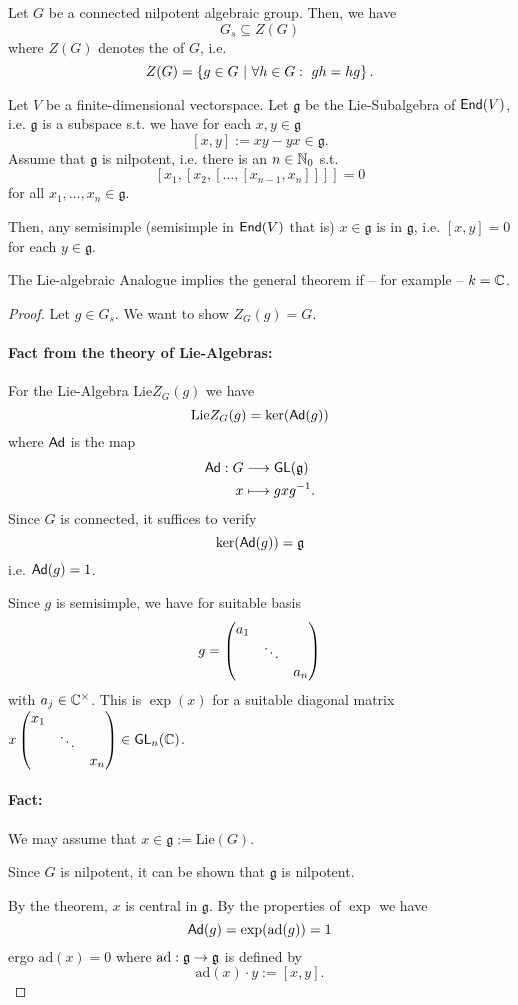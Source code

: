 \begin{theorem}
	Let $G$ be a connected nilpotent algebraic group. Then, we have
	\[ G_s \subseteq Z(G) \]
	where $Z(G)$ denotes the  of $G$, i.e.
	\[ Z(G) = \left\lbrace g \in G ~ | ~ \forall h \in G:~gh = hg\right\rbrace. \]
\end{theorem}
\begin{theorem}
Let $V$ be a finite-dimensional vectorspace. Let $\mathfrak{g}$ be the Lie-Subalgebra of $\textsf{End}(V)$, i.e. $\mathfrak{g}$ is a subspace s.t. we have for each $x,y \in \mathfrak{g}$
\[ [x,y] := xy - yx \in \mathfrak{g}. \]
Assume that $\mathfrak{g}$ is nilpotent, i.e. there is an $n \in \mathbb{N}_0$ s.t.
\[ [x_1, [x_2, [\ldots, [x_{n-1}, x_n]]]] = 0 \]
for all $x_1, \ldots, x_n \in \mathfrak{g}$.

Then, any semisimple (semisimple in $\textsf{End}(V)$ that is) $x \in \mathfrak{g}$ is  in $\mathfrak{g}$, i.e. $[x,y] = 0$ for each $y \in \mathfrak{g}$.
\end{theorem}
\begin{remark}
	The Lie-algebraic Analogue implies the general theorem if -- for example -- $k = \mathbb{C}$.
\end{remark}
\begin{proof}
Let $g \in G_s$. We want to show $Z_G(g) = G$.

\newcommand{\Lie}{\mathrm{Lie}}
\paragraph{Fact from the theory of Lie-Algebras:}
For the Lie-Algebra $\Lie Z_G(g)$ we have
\[ \Lie Z_G(g) = \ker (\Ad(g)) \]
where $\textsf{Ad}$ is the map
\begin{align*}
\textsf{Ad} : G & \overset{}{\longrightarrow} \textsf{GL}(\mathfrak{g})\\
x & \longmapsto gxg^{-1}.
\end{align*}
Since $G$ is connected, it suffices to verify
\[ \ker (\textsf{Ad} (g)) = \mathfrak{g} \]
i.e. $\textsf{Ad}(g) = 1$.

Since $g$ is semisimple, we have for suitable basis
\[ g = \left(\begin{matrix} a_1 \\ & \ddots \\ & & a_n \end{matrix}\right) \]
with $a_j \in \mathbb{C}^\times$. This is $\exp(x)$ for a suitable diagonal matrix $x \left(\begin{matrix} x_1 \\ & \ddots \\ & & x_n \end{matrix}\right) \in \textsf{GL}_n(\mathbb{C})$.
\paragraph{Fact:}
We may assume that $x \in \mathfrak{g} := \Lie (G)$.

Since $G$ is nilpotent, it can be shown that $\mathfrak{g}$ is nilpotent.

By the theorem, $x$ is central in $\mathfrak{g}$. By the properties of $\exp$ we have
\[ \textsf{Ad}(g) = \exp(\mathrm{ad}(g)) = 1 \]
ergo $\mathrm{ad}(x) = 0$ where $\mathrm{ad}: \mathfrak{g} \overset{}{\rightarrow} \mathfrak{g}$ is defined by 
\[ \mathrm{ad}(x) \cdot y := [x,y]. \]
\end{proof}

